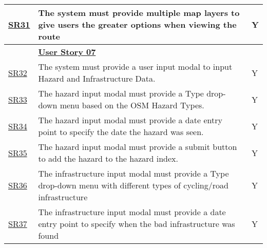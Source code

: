 \begin{table}[!htb]
\begin{tabularx}{\textwidth}{ p{1cm} p{11cm} p{1cm} }
        \hyperref[SR:31]{SR31} & The system must provide multiple map layers to give users the greater options when viewing the route & Y\\ 
        \hline
        & \textbf{\hyperref[tab:user-story-07]{User Story 07}}  \\
        \hyperref[SR:32]{SR32} & The system must provide a user input modal to input Hazard and Infrastructure Data. & Y \\
        \hyperref[SR:33]{SR33} & The hazard input modal must provide a Type drop-down menu based on the OSM Hazard Types. & Y\\
        \hyperref[SR:34]{SR34} & The hazard input modal must provide a date entry point to specify the date the hazard was seen. & Y\\
        \hyperref[SR:35]{SR35} & The hazard input modal must provide a submit button to add the hazard to the hazard index. & Y\\
        \hyperref[SR:36]{SR36} & The infrastructure input modal must provide a Type drop-down menu with different types of cycling/road infrastructure & Y\\
        \hyperref[SR:37]{SR37} & The infrastructure input modal must provide a date entry point to specify when the bad infrastructure was found & Y\\
        \hline
    \end{tabularx}
\end{table}
\clearpage


